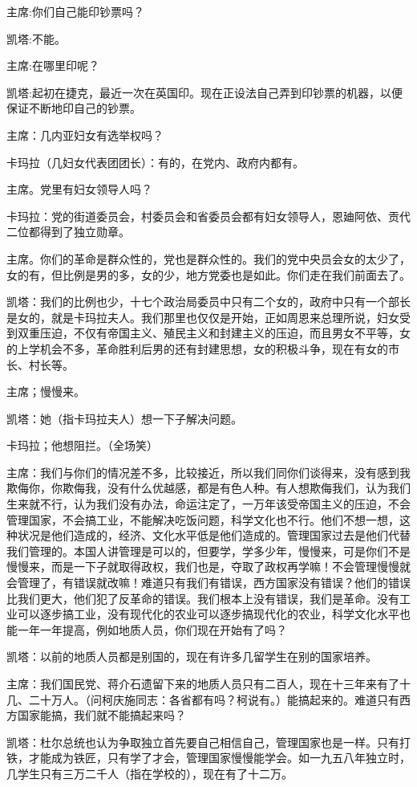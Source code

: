 主席:你们自己能印钞票吗？

凯塔:不能。

主席:在哪里印呢？

凯塔:起初在捷克，最近一次在英国印。现在正设法自己弄到印钞票的机器，以便保证不断地印自己的钞票。

主席：几内亚妇女有选举权吗？

卡玛拉（几妇女代表团团长）：有的，在党内、政府内都有。

主席。党里有妇女领导人吗？

卡玛拉：党的街道委员会，村委员会和省委员会都有妇女领导人，恩廸阿依、贡代二位都得到了独立勋章。

主席。你们的革命是群众性的，党也是群众性的。我们的党中央员会女的太少了，女的有，但比例是男的多，女的少，地方党委也是如此。你们走在我们前面去了。

凯塔：我们的比例也少，十七个政治局委员中只有二个女的，政府中只有一个部长是女的，就是卡玛拉夫人。我们那里也仅仅是开始，正如周恩来总理所说，妇女受到双重压迫，不仅有帝国主义、殖民主义和封建主义的压迫，而且男女不平等，女的上学机会不多，革命胜利后男的还有封建思想，女的积极斗争，现在有女的市长、村长等。

主席；慢慢来。

凯塔：她（指卡玛拉夫人）想一下子解决问题。

卡玛拉；他想阻拦。（全场笑）

主席：我们与你们的情况差不多，比较接近，所以我们同你们谈得来，没有感到我欺侮你，你欺侮我，没有什么优越感，都是有色人种。有人想欺侮我们，认为我们生来就不行，认为我们没有办法，命运注定了，一万年该受帝国主义的压迫，不会管理国家，不会搞工业，不能解决吃饭问题，科学文化也不行。他们不想一想，这种状况是他们造成的，经济、文化水平低是他们造成的。管理国家过去是他们代替我们管理的。本国人讲管理是可以的，但要学，学多少年，慢慢来，可是你们不是慢慢来，而是一下子就取得政权，我们也是，夺取了政权再学嘛！不会管理慢慢就会管理了，有错误就改嘛！难道只有我们有错误，西方国家没有错误？他们的错误比我们更大，他们犯了反革命的错误。我们根本上没有错误，我们是革命。没有工业可以逐步搞工业，没有现代化的农业可以逐步搞现代化的农业，科学文化水平也能一年一年提高，例如地质人员，你们现在开始有了吗？

凯塔：以前的地质人员都是别国的，现在有许多几留学生在别的国家培养。

主席：我们国民党、蒋介石遗留下来的地质人员只有二百人，现在十三年来有了十几、二十万人。（问柯庆施同志：各省都有吗？柯说有。）能搞起来的。难道只有西方国家能搞，我们就不能搞起来吗？

凯塔：杜尔总统也认为争取独立首先要自己相信自己，管理国家也是一样。只有打铁，才能成为铁匠，只有学了才会，管理国家慢慢能学会。如一九五八年独立时，几学生只有三万二千人（指在学校的），现在有了十二万。

